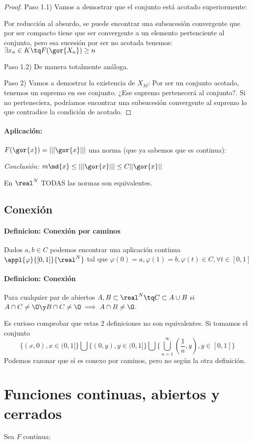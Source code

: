 \documentclass[a4paper,10pt]{apuntes}
\newcommand{\definition}[1]{\paragraph{Definicion: #1\\}}
\begin{document}
\begin{proof}

 Paso 1.1) Vamos a demostrar que el conjunto está acotado superiormente:
 
 Por reducción al absurdo, se puede encontrar una subsucesión convergente que por ser compacto tiene que ser convergente a un elemento pertenciente al conjunto, pero esa sucesión por ser no acotada tenemos: $\exists x_n \in K \tq F(\gor{X_n}) \ge n$
 
 Paso 1.2) De manera totalmente análoga.
 
 Paso 2) Vamos a demostrar la existencia de $X_M$:
 Por ser un conjunto acotado, tenemos un supremo en ese conjunto. ¿Ese supremo pertenecerá al conjunto?. Si no perteneciera, podríamos encontrar una subsucesión convergente al supremo lo que contradice la condición de acotado.
\end{proof}

\paragraph{Aplicación:}
$F(\gor{x}) = |||\gor{x}|||$ una norma (que ya sabemos que es continua):

\emph{Conclusión:} $m \md{x} \leq |||\gor{x}||| \leq C||\gor{x}||$

\begin{theorem}
En $\real^N$ TODAS las normas son equivalentes. 
\end{theorem}

\subsection{Conexión}
\definition{Conexión por caminos}
Dados $a,b \in C$ podemos encontrar una aplicación continua $\appl{\varphi}{[0,1]}{\real^N}$ tal que $\varphi(0) = a, \varphi(1) = b, \varphi(t) \in C, \forall t \in [0,1]$
\definition{Conexión}
Para cualquier par de abiertos $A,B \subset \real^N \tq C\subset A\cup B$ si $A\cap C\neq \O \y B\cap C \neq \O \implies A\cap B \neq \O$.
\begin{remark}
Es curioso comprobar que estas 2 definiciones no son equivalentes. Si tomamos el conjunto
$$\displaystyle\{(x,0), x\in (0,1]\} \bigcup \{(0,y), y \in (0,1]\} \bigcup \{\displaystyle\bigcup_{n=1}^{\infty}{\left(\frac{1}{n},y\right), y \in [0,1]}\}$$
Podemos razonar que sí es conexo por caminos, pero no según la otra definición.
\end{remark}
\section{Funciones continuas, abiertos y cerrados}
Sea $F$ continua:
\end{document}

